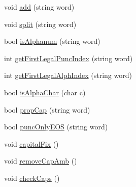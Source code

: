 \begin{DoxyCompactItemize}
\item 
void \hyperlink{class_word_counts_adbf0439b0c4b121316417c8f57a2c59e}{add} (string word)
\item 
void \hyperlink{class_word_counts_a403b84161c89026a98fe93f4965abc10}{split} (string word)
\item 
bool \hyperlink{class_word_counts_a94a625bf72762f6c42e6a0f42a0c7a33}{is\+Alphanum} (string word)
\item 
int \hyperlink{class_word_counts_a4d4aa5ef3a804708264f95e2864934b0}{get\+First\+Legal\+Punc\+Index} (string word)
\item 
int \hyperlink{class_word_counts_a485f72f278ca6f8156f5488379a83d1e}{get\+First\+Legal\+Alph\+Index} (string word)
\item 
bool \hyperlink{class_word_counts_ae1ba379747b777457ad9e0a103193c65}{is\+Alpha\+Char} (char c)
\item 
bool \hyperlink{class_word_counts_aaf8065eee6259b08789219146ae5b066}{prop\+Cap} (string word)
\item 
bool \hyperlink{class_word_counts_adae2e4cbe9712ea641293c2d6b941edb}{punc\+Only\+E\+OS} (string word)
\item 
void \hyperlink{class_word_counts_a755bf8c6d952149447d0b7ee85b08106}{capital\+Fix} ()
\item 
void \hyperlink{class_word_counts_ad3f785a53d110a84e555732b6de5492e}{remove\+Cap\+Amb} ()
\item 
void \hyperlink{class_word_counts_a224e6e76ffa6a20b0cb38fbc4ecf1954}{check\+Caps} ()
\end{DoxyCompactItemize}
